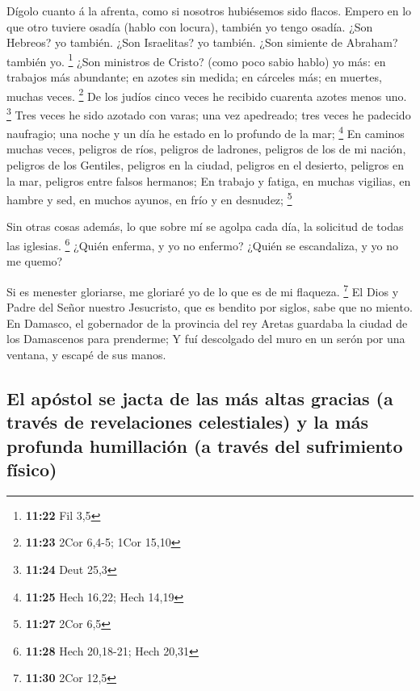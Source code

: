  Dígolo cuanto á la afrenta, como si nosotros hubiésemos
sido flacos. Empero en lo que otro tuviere osadía (hablo con locura),
también yo tengo osadía.  ¿Son Hebreos? yo también. ¿Son
Israelitas? yo también. ¿Son simiente de Abraham? también yo.
\footnote{\textbf{11:22} Fil 3,5}  ¿Son ministros de
Cristo? (como poco sabio hablo) yo más: en trabajos más abundante; en
azotes sin medida; en cárceles más; en muertes, muchas veces.
\footnote{\textbf{11:23} 2Cor 6,4-5; 1Cor 15,10}  De los
judíos cinco veces he recibido cuarenta azotes menos uno. \footnote{\textbf{11:24}
  Deut 25,3}  Tres veces he sido azotado con varas; una
vez apedreado; tres veces he padecido naufragio; una noche y un día he
estado en lo profundo de la mar; \footnote{\textbf{11:25} Hech 16,22;
  Hech 14,19}  En caminos muchas veces, peligros de ríos,
peligros de ladrones, peligros de los de mi nación, peligros de los
Gentiles, peligros en la ciudad, peligros en el desierto, peligros en la
mar, peligros entre falsos hermanos;  En trabajo y
fatiga, en muchas vigilias, en hambre y sed, en muchos ayunos, en frío y
en desnudez; \footnote{\textbf{11:27} 2Cor 6,5}

 Sin otras cosas además, lo que sobre mí se agolpa cada
día, la solicitud de todas las iglesias. \footnote{\textbf{11:28} Hech
  20,18-21; Hech 20,31}  ¿Quién enferma, y yo no enfermo?
¿Quién se escandaliza, y yo no me quemo?

 Si es menester gloriarse, me gloriaré yo de lo que es de
mi flaqueza. \footnote{\textbf{11:30} 2Cor 12,5}  El Dios
y Padre del Señor nuestro Jesucristo, que es bendito por siglos, sabe
que no miento.  En Damasco, el gobernador de la provincia
del rey Aretas guardaba la ciudad de los Damascenos para prenderme;
 Y fuí descolgado del muro en un serón por una ventana, y
escapé de sus manos.

\hypertarget{el-apuxf3stol-se-jacta-de-las-muxe1s-altas-gracias-a-travuxe9s-de-revelaciones-celestiales-y-la-muxe1s-profunda-humillaciuxf3n-a-travuxe9s-del-sufrimiento-fuxedsico}{%
\subsection{El apóstol se jacta de las más altas gracias (a través de
revelaciones celestiales) y la más profunda humillación (a través del
sufrimiento
físico)}\label{el-apuxf3stol-se-jacta-de-las-muxe1s-altas-gracias-a-travuxe9s-de-revelaciones-celestiales-y-la-muxe1s-profunda-humillaciuxf3n-a-travuxe9s-del-sufrimiento-fuxedsico}}

